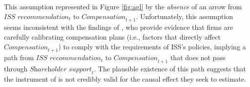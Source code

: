 \documentclass[11pt,reqno,titlepage]{amsart}
\begin{document}
This assumption represented in Figure \ref{fig:agl} by the \emph{absence} of an arrow from $\textit{ISS recommendation}_t$ to $\textit{Compensation}_{t+1}$.
Unfortunately, this assumption seems inconsistent with the findings of \citet{Gow:2013aa}, who provide evidence that firms are carefully calibrating compensation plans (i.e., factors that directly affect $\textit{Compensation}_{t+1}$) to comply with the requirements of ISS's policies, implying a path from $\textit{ISS recommendation}_t$ to $\textit{Compensation}_{t+1}$ that does not pass through $\textit{Shareholder support}_{t}$.
The plausible existence of this path suggests that the instrument of \citet[p.\,912]{Armstrong:2013io} is not credibly valid for the causal effect they seek to estimate.
\end{document}
